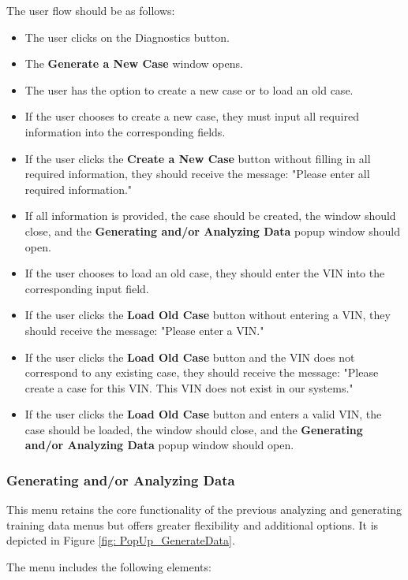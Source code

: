 \documentclass[]{scrreprt}
\begin{document}
The user flow should be as follows:

\begin{itemize}
    \item The user clicks on the Diagnostics button.
    \item The \textbf{Generate a New Case} window opens.
    \item The user has the option to create a new case or to load an old case.
    \item If the user chooses to create a new case, they must input all required information into the corresponding fields.
    \item If the user clicks the \textbf{Create a New Case} button without filling in all required information, they should receive the message: "Please enter all required information."
    \item If all information is provided, the case should be created, the window should close, and the \textbf{Generating and/or Analyzing Data} popup window should open.
    \item If the user chooses to load an old case, they should enter the VIN into the corresponding input field.
    \item If the user clicks the \textbf{Load Old Case} button without entering a VIN, they should receive the message: "Please enter a VIN."
    \item If the user clicks the \textbf{Load Old Case} button and the VIN does not correspond to any existing case, they should receive the message: 
    "Please create a case for this VIN. This VIN does not exist in our systems."
    \item If the user clicks the \textbf{Load Old Case} button and enters a valid VIN, the case should be loaded, the window should close, 
    and the \textbf{Generating and/or Analyzing Data} popup window should open.
\end{itemize}

\subsubsection{Generating and/or Analyzing Data}

This menu retains the core functionality of the previous analyzing and generating training data menus but offers greater flexibility and additional options. It is depicted in Figure \ref{fig: PopUp_GenerateData}.

The menu includes the following elements:
\end{document}
